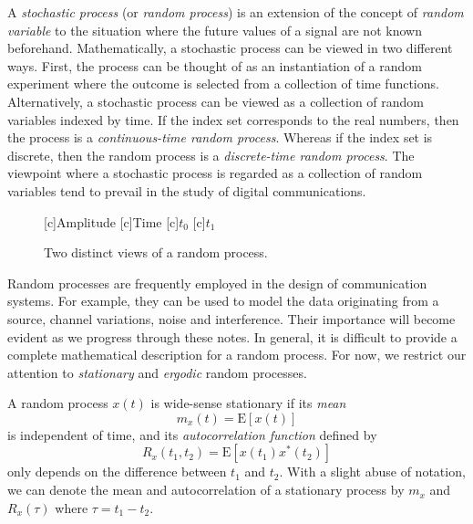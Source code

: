 A \emph{stochastic process} (or \emph{random process}) is an extension of the concept of \emph{random variable} to the situation where the future values of a signal are not known beforehand.
Mathematically, a stochastic process can be viewed in two different ways.
First, the process can be thought of as an instantiation of a random experiment where the outcome is selected from a collection of time functions.
Alternatively, a stochastic process can be viewed as a collection of random variables indexed by time.
If the index set corresponds to the real numbers, then the process is a \emph{continuous-time random process}.
Whereas if the index set is discrete, then the random process is a \emph{discrete-time random process}.
The viewpoint where a stochastic process is regarded as a collection of random variables tend to prevail in the study of digital communications.
\begin{figure}[htbp]
\begin{center}
\begin{psfrags}
[c]{Amplitude}
[c]{Time}
[c]{$t_0$}
[c]{$t_1$}
\end{psfrags}
\caption{Two distinct views of a random process.}
\label{figure:RandomProcess}
\end{center}
\end{figure}

Random processes are frequently employed in the design of communication systems.
For example, they can be used to model the data originating from a source, channel variations, noise and interference.
Their importance will become evident as we progress through these notes.
In general, it is difficult to provide a complete mathematical description for a random process.
For now, we restrict our attention to \emph{stationary} and \emph{ergodic} random processes.

\begin{definition}[Stationarity]
A random process $x(t)$ is wide-sense stationary if its \emph{mean}
\begin{equation*}
m_x(t) = \mathrm{E} [x(t)]
\end{equation*}
is independent of time, and its \emph{autocorrelation function} defined by
\begin{equation*}
R_x(t_1, t_2) = \mathrm{E} [x(t_1) x^*(t_2)]
\end{equation*}
only depends on the difference between $t_1$ and $t_2$.
With a slight abuse of notation, we can denote the mean and autocorrelation of a stationary process by $m_x$ and $R_x(\tau)$ where $\tau = t_1 - t_2$.
\end{definition}

